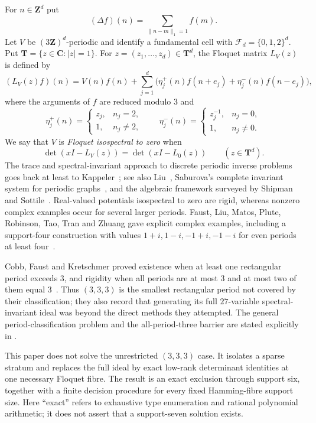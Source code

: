 \documentclass[11pt,reqno]{amsart}
\theoremstyle{definition}
\theoremstyle{remark}
\newcommand{\C}{\mathbf C}
\newcommand{\T}{\mathbf T}
\newcommand{\Z}{\mathbf Z}
\begin{document}
For $n\in\Z^d$ put
\[
 (\Delta f)(n)=\sum_{\lVert n-m\rVert_1=1} f(m).
\]
Let $V$ be $(3\Z)^d$-periodic and identify a fundamental cell with
$\mathcal F_d=\{0,1,2\}^d$.  Put
$\T=\{z\in\C:|z|=1\}$.  For $z=(z_1,\ldots,z_d)\in\T^d$, the Floquet
matrix $L_V(z)$ is defined by
\[
 (L_V(z)f)(n)=V(n)f(n)+
 \sum_{j=1}^d\bigl(\eta_j^+(n)f(n+e_j)
              +\eta_j^-(n)f(n-e_j)\bigr),
\]
where the arguments of $f$ are reduced modulo $3$ and
\[
 \eta_j^+(n)=\begin{cases}z_j,&n_j=2,\\1,&n_j\neq2,\end{cases}
 \qquad
 \eta_j^-(n)=\begin{cases}z_j^{-1},&n_j=0,\\1,&n_j\neq0.\end{cases}
\]
We say that $V$ is \emph{Floquet isospectral to zero} when
\begin{equation}\label{eq:floquet-definition}
 \det(xI-L_V(z))=\det(xI-L_0(z))
 \qquad(z\in\T^d).
\end{equation}
The trace and spectral-invariant approach to discrete periodic inverse
problems goes back at least to Kappeler~\cite{kappeler1989}; see also
Liu~\cite{liu2023}, Saburova's complete invariant system for periodic
graphs~\cite{saburova2026}, and the algebraic framework surveyed by Shipman
and Sottile~\cite{shipman2026}.  Real-valued potentials isospectral to zero
are rigid, whereas nonzero complex examples occur for several larger
periods.  Faust, Liu, Matos, Plute, Robinson, Tao, Tran and Zhuang gave
explicit complex examples, including a support-four construction with
values $1+i,1-i,-1+i,-1-i$ for even periods at least four~\cite{faust2024}.

Cobb, Faust and Kretschmer proved existence when at least one rectangular
period exceeds $3$, and rigidity when all periods are at most $3$ and at
most two of them equal $3$~\cite{cobb2026}.  Thus $(3,3,3)$ is the smallest
rectangular period not covered by their classification; they also record
that generating its full $27$-variable spectral-invariant ideal was beyond
the direct methods they attempted.  The general period-classification
problem and the all-period-three barrier are stated explicitly in
\cite[Problem~1]{faustideal2026}.

This paper does not solve the unrestricted $(3,3,3)$ case.  It isolates a
sparse stratum and replaces the full ideal by exact low-rank determinant
identities at one necessary Floquet fibre.  The result is an exact exclusion
through support six, together with a finite decision procedure for every
fixed Hamming-fibre support size.  Here ``exact'' refers to exhaustive type
enumeration and rational polynomial arithmetic; it does not assert that a
support-seven solution exists.
\end{document}
